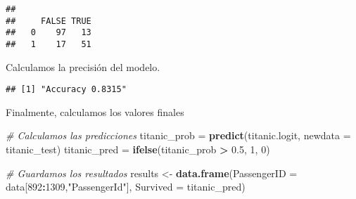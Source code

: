 \documentclass[]{article}
\newenvironment{Shaded}{\begin{snugshade}}{\end{snugshade}}
\newcommand{\KeywordTok}[1]{\textcolor[rgb]{0.13,0.29,0.53}{\textbf{#1}}}
\newcommand{\DataTypeTok}[1]{\textcolor[rgb]{0.13,0.29,0.53}{#1}}
\newcommand{\DecValTok}[1]{\textcolor[rgb]{0.00,0.00,0.81}{#1}}
\newcommand{\FloatTok}[1]{\textcolor[rgb]{0.00,0.00,0.81}{#1}}
\newcommand{\StringTok}[1]{\textcolor[rgb]{0.31,0.60,0.02}{#1}}
\newcommand{\CommentTok}[1]{\textcolor[rgb]{0.56,0.35,0.01}{\textit{#1}}}
\newcommand{\OperatorTok}[1]{\textcolor[rgb]{0.81,0.36,0.00}{\textbf{#1}}}
\newcommand{\NormalTok}[1]{#1}
\begin{document}
\begin{verbatim}
##    
##     FALSE TRUE
##   0    97   13
##   1    17   51
\end{verbatim}

\begin{Shaded}
\end{Shaded}

Calculamos la precisión del modelo.

\begin{Shaded}
\end{Shaded}

\begin{verbatim}
## [1] "Accuracy 0.8315"
\end{verbatim}

Finalmente, calculamos los valores finales

\begin{Shaded}
\begin{Highlighting}[]
\CommentTok{# Calculamos las predicciones}
\NormalTok{titanic_prob =}\StringTok{ }\KeywordTok{predict}\NormalTok{(titanic.logit, }\DataTypeTok{newdata =}\NormalTok{ titanic_test)}
\NormalTok{titanic_pred =}\StringTok{ }\KeywordTok{ifelse}\NormalTok{(titanic_prob }\OperatorTok{>}\StringTok{ }\FloatTok{0.5}\NormalTok{, }\DecValTok{1}\NormalTok{, }\DecValTok{0}\NormalTok{)}
\end{Highlighting}
\end{Shaded}

\begin{Shaded}
\begin{Highlighting}[]
\CommentTok{# Guardamos los resultados}
\NormalTok{results <-}\StringTok{ }\KeywordTok{data.frame}\NormalTok{(}\DataTypeTok{PassengerID =}\NormalTok{ data[}\DecValTok{892}\OperatorTok{:}\DecValTok{1309}\NormalTok{,}\StringTok{"PassengerId"}\NormalTok{], }\DataTypeTok{Survived =}\NormalTok{ titanic_pred)}
\end{Highlighting}
\end{Shaded}
\end{document}
